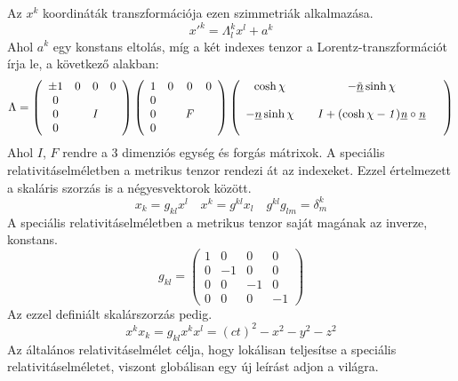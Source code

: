 \documentclass[a4paper,12pt]{article}
\begin{document}
\vspace{0.5cm} Az $x^{k}$ koordináták transzformációja ezen szimmetriák alkalmazása.
\begin{equation*}
x'^{k} = \Lambda^{k}_{l}x^{l} + a^{k}
\end{equation*}
\vspace{0.5cm} Ahol $a^{k}$ egy konstans eltolás, míg a két indexes tenzor a Lorentz-transzformációt írja le, a következő alakban:
\begin{equation*}
\Lambda = \left(\begin{array}{cccc} \pm 1&0&0&0 \\ 0& && \\ 0 &&\it{\Large{I}} &\\ 0 && & \end{array}\right)
\left(\begin{array}{cccc} 1&0&0&0 \\ 0& & & \\ 0 & & \it{\large{F}} &\\ 0 &&&  \end{array}\right)
\left(\begin{array}{cccc} \cosh{\chi}&&-\underline{\tilde{n}}\sinh{\chi}& \\ &  && \\ -\underline{n}\sinh{\chi}&&\it{\large{I + (\cosh{\chi} - 1)\underline{n}\circ \underline{n}}}&\\ && & \end{array}\right)
\end{equation*}
\newline
Ahol $I$, $F$ rendre a 3 dimenziós egység és forgás mátrixok.  \newline
\hspace{1cm}
\vspace{0.5cm} A speciális relativitáselméletben a metrikus tenzor rendezi át az indexeket. Ezzel értelmezett a skaláris szorzás is a négyesvektorok között.
\begin{equation*}
x_{k} = g_{kl}x^{l} \quad x^{k} = g^{kl}x_{l} \quad g^{kl}g_{lm} = \delta^{k}_{m}
\end{equation*}
\vspace{0.5cm} A speciális relativitáselméletben a metrikus tenzor saját magának az inverze, konstans.
\begin{equation*}
g_{kl} = \left(\begin{array}{cccc} 1&0&0&0\\ 0&-1&0&0\\ 0&0&-1&0\\0&0&0&-1 \end{array}\right)
\end{equation*}
\vspace{0.5cm} Az ezzel definiált skalárszorzás pedig.
\begin{equation*}
x^{k}x_{k} = g_{kl}x^{k}x^{l} = (ct)^{2} - x^{2} - y^{2} - z^{2}
\end{equation*}
Az általános relativitáselmélet célja, hogy lokálisan teljesítse a speciális relativitáselméletet, viszont globálisan egy új leírást adjon a világra.
\newpage
\end{document}
